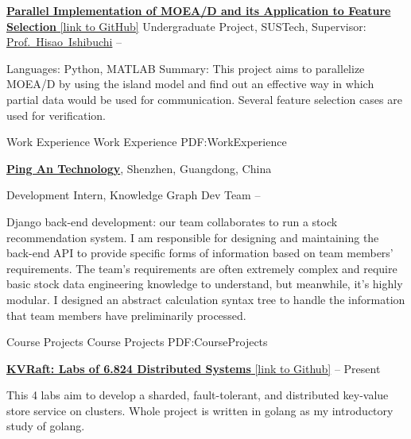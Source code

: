 \documentclass[a4paper,MMMyyyy,nonstopmode]{simpleresumecv}
\begin{document}
\begin{Body}
    \Entry
    \href{https://github.com/hackroid/pMOEA-D}
    {\textbf{Parallel Implementation of MOEA/D and its Application to Feature Selection} [link to GitHub]}
    \BulletItem
    Undergraduate Project, SUSTech, Supervisor: \href{https://hisaolab-sustech.github.io/}{Prof.~Hisao~Ishibuchi}
    \hfill
     --
    \begin{Detail}
        \SubBulletItem
        Languages: Python, MATLAB
        \SubBulletItem
        Summary:
        This project aims to parallelize MOEA/D by using the island model and find out an effective way in which partial data would be used for communication. Several feature selection cases are used for verification.
    \end{Detail}



    \Section
    {Work\newline
        Experience}
    {Work Experience}
    {PDF:WorkExperience}

    \Entry
    \href{https://tech.pingan.com/}
    {\textbf{Ping An Technology}},
    Shenzhen, Guangdong, China

    \BulletItem
    Development Intern,
    Knowledge Graph Dev Team
    \hfill
     --
    \begin{Detail}
        \SubBulletItem
        Django back-end development: our team collaborates to run a stock recommendation system. I am responsible for designing and maintaining the back-end API to provide specific forms of information based on team members' requirements. The team's requirements are often extremely complex and require basic stock data engineering knowledge to understand, but meanwhile, it's highly modular. I designed an abstract calculation syntax tree to handle the information that team members have preliminarily processed.
    \end{Detail}



    \Section
    {Course \newline
        Projects}
    {Course Projects}
    {PDF:CourseProjects}

    \BulletItem
    \href{https://github.com/hackroid/6.824-2023sp}{\textbf{KVRaft: Labs of 6.824 Distributed Systems} [link to Github]}
    \hfill
     -- Present
    \begin{Detail}
        \SubBulletItem
        This 4 labs aim to develop a sharded, fault-tolerant, and distributed key-value store service on clusters. Whole project is written in golang as my introductory study of golang.
    \end{Detail}


\end{Body}
\end{document}
